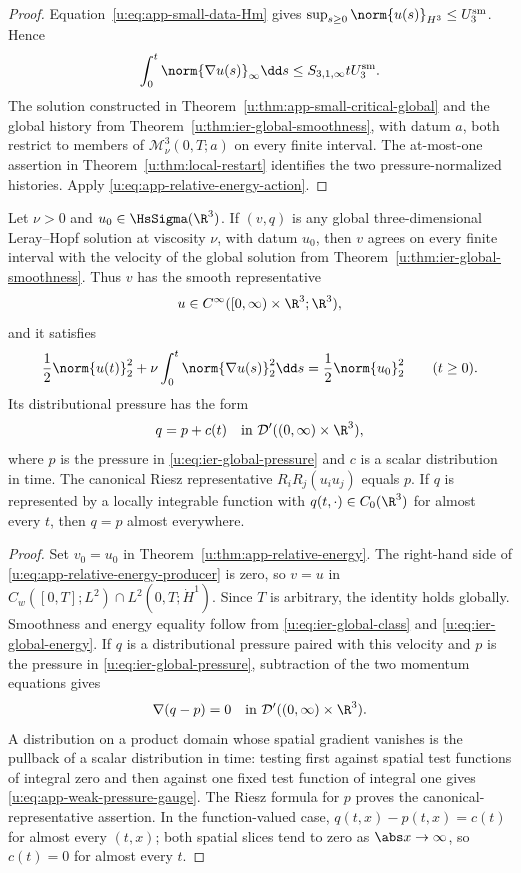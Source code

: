 \begin{proof}
Equation~\eqref{u:eq:app-small-data-Hm} gives
\(\sup_{s\ge0}\norm{u(s)}_{H^3}\le U_3^{\rm sm}\).  Hence
\[
 \int_0^t\norm{\nabla u(s)}_\infty\dd s
 \le S_{3,1,\infty}tU_3^{\rm sm}.
\]
The solution constructed in Theorem~\ref{u:thm:app-small-critical-global} and
the global history from Theorem~\ref{u:thm:ier-global-smoothness}, with datum
\(a\), both restrict to members of
\(\mathscr M_\nu^3(0,T;a)\) on every finite interval.  The at-most-one
assertion in Theorem~\ref{u:thm:local-restart} identifies the two
pressure-normalized histories.
Apply \eqref{u:eq:app-relative-energy-action}.
\end{proof}

\begin{corollary}
\label{u:cor:app-leray-uniqueness}
Let \(\nu>0\) and \(u_0\in\HsSigma(\R^3)\).  If \((v,q)\) is any global
three-dimensional Leray--Hopf solution at viscosity \(\nu\), with datum
\(u_0\), then \(v\) agrees on every finite interval with the velocity of the
global solution from Theorem~\ref{u:thm:ier-global-smoothness}.  Thus \(v\) has
the smooth
representative
\[
 u\in C^\infty([0,\infty)\times\R^3;\R^3),
\]
and it satisfies
\[
 \frac12\norm{u(t)}_2^2
 +\nu\int_0^t\norm{\nabla u(s)}_2^2\dd s
 =\frac12\norm{u_0}_2^2
 \qquad(t\ge0).
\]
Its distributional pressure has the form
\begin{equation}
 q=p+c(t)
 \quad\text{in }\mathcal D'((0,\infty)\times\R^3),
 \label{u:eq:app-weak-pressure-gauge}
\end{equation}
where \(p\) is the pressure in \eqref{u:eq:ier-global-pressure} and \(c\) is a
scalar distribution in time.  The canonical Riesz representative
\(R_iR_j(u_i u_j)\) equals \(p\).  If \(q\) is represented by a locally
integrable function with \(q(t,\cdot)\in C_0(\R^3)\) for almost every \(t\),
then \(q=p\) almost everywhere.
\end{corollary}

\begin{proof}
Set \(v_0=u_0\) in Theorem~\ref{u:thm:app-relative-energy}.  The right-hand
side of \eqref{u:eq:app-relative-energy-producer} is zero, so
\(v=u\) in \(C_w([0,T];L^2)\cap L^2(0,T;\dot H^1)\).  Since \(T\) is
 arbitrary, the identity holds globally.  Smoothness and energy equality
 follow from \eqref{u:eq:ier-global-class} and
 \eqref{u:eq:ier-global-energy}.  If \(q\) is a distributional pressure paired
 with this velocity and \(p\) is the pressure in
 \eqref{u:eq:ier-global-pressure}, subtraction of the two momentum equations
 gives
 \[
  \nabla(q-p)=0
  \quad\text{in }\mathcal D'((0,\infty)\times\R^3).
 \]
 A distribution on a product domain whose spatial gradient vanishes is the
 pullback of a scalar distribution in time: testing first against spatial test
 functions of integral zero and then against one fixed test function of
 integral one gives \eqref{u:eq:app-weak-pressure-gauge}.  The Riesz formula for
 \(p\) proves the canonical-representative assertion.  In the function-valued
 case, \(q(t,x)-p(t,x)=c(t)\) for almost every \((t,x)\); both spatial slices
 tend to zero as \(\abs x\to\infty\), so \(c(t)=0\) for almost every \(t\).
\end{proof}
